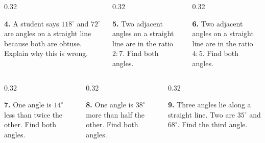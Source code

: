 \documentclass[aspectratio=169,12pt]{beamer}
\newcommand{\MMProblem}[2]{\begin{MMProblemCard}\raggedright\small\textbf{#1.} #2\par\end{MMProblemCard}}
\begin{document}
\begin{frame}[t]
\begin{columns}[T,onlytextwidth]
\begin{column}{0.32\textwidth}\MMProblem{4}{A student says \mbox{$118^\circ$} and \mbox{$72^\circ$} are angles on a straight line because both are obtuse. Explain why this is wrong.}\end{column}
\begin{column}{0.32\textwidth}\MMProblem{5}{Two adjacent angles on a straight line are in the ratio \mbox{$2:7$}. Find both angles.}\end{column}
\begin{column}{0.32\textwidth}\MMProblem{6}{Two adjacent angles on a straight line are in the ratio \mbox{$4:5$}. Find both angles.}\end{column}
\end{columns}
\vspace{0.45em}
\begin{columns}[T,onlytextwidth]
\begin{column}{0.32\textwidth}\MMProblem{7}{One angle is \mbox{$14^\circ$} less than twice the other. Find both angles.}\end{column}
\begin{column}{0.32\textwidth}\MMProblem{8}{One angle is \mbox{$38^\circ$} more than half the other. Find both angles.}\end{column}
\begin{column}{0.32\textwidth}\MMProblem{9}{Three angles lie along a straight line. Two are \mbox{$35^\circ$} and \mbox{$68^\circ$}. Find the third angle.}\end{column}
\end{columns}
\end{frame}
\end{document}
